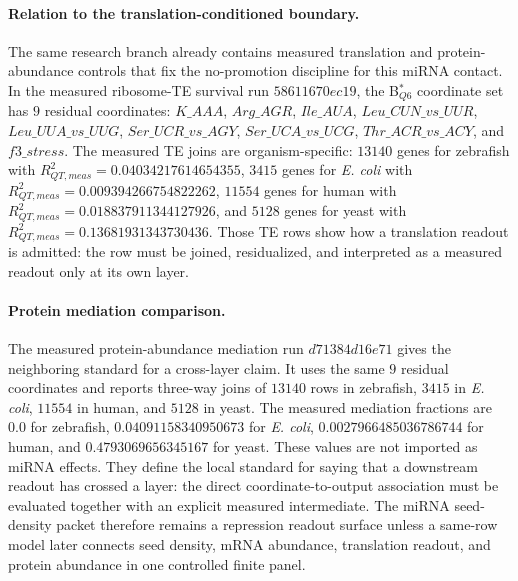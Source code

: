 \paragraph{Relation to the translation-conditioned boundary.}
The same research branch already contains measured translation and protein-abundance controls that fix the no-promotion discipline for this miRNA contact.  In the measured ribosome-TE survival run $58611670ec19$, the B$^*_{Q6}$ coordinate set has $9$ residual coordinates: $K\_AAA$, $Arg\_AGR$, $Ile\_AUA$, $Leu\_CUN\_vs\_UUR$, $Leu\_UUA\_vs\_UUG$, $Ser\_UCR\_vs\_AGY$, $Ser\_UCA\_vs\_UCG$, $Thr\_ACR\_vs\_ACY$, and $f3\_stress$.  The measured TE joins are organism-specific: $13140$ genes for zebrafish with $R^2_{QT,meas}=0.04034217614654355$, $3415$ genes for \emph{E. coli} with $R^2_{QT,meas}=0.009394266754822262$, $11554$ genes for human with $R^2_{QT,meas}=0.018837911344127926$, and $5128$ genes for yeast with $R^2_{QT,meas}=0.13681931343730436$.  Those TE rows show how a translation readout is admitted: the row must be joined, residualized, and interpreted as a measured readout only at its own layer.

\paragraph{Protein mediation comparison.}
The measured protein-abundance mediation run $d71384d16e71$ gives the neighboring standard for a cross-layer claim.  It uses the same $9$ residual coordinates and reports three-way joins of $13140$ rows in zebrafish, $3415$ in \emph{E. coli}, $11554$ in human, and $5128$ in yeast.  The measured mediation fractions are $0.0$ for zebrafish, $0.04091158340950673$ for \emph{E. coli}, $0.0027966485036786744$ for human, and $0.4793069656345167$ for yeast.  These values are not imported as miRNA effects.  They define the local standard for saying that a downstream readout has crossed a layer: the direct coordinate-to-output association must be evaluated together with an explicit measured intermediate.  The miRNA seed-density packet therefore remains a repression readout surface unless a same-row model later connects seed density, mRNA abundance, translation readout, and protein abundance in one controlled finite panel.


